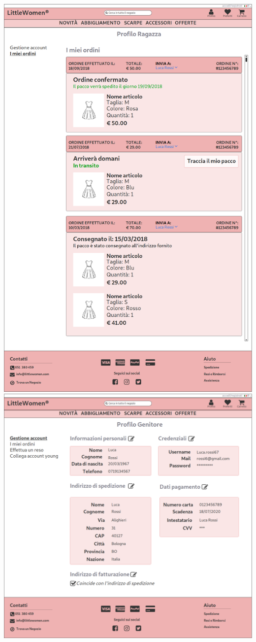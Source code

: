 \documentclass[12pt,a4paper]{report}
\begin{document}
\includegraphics[width=\textwidth]{"Project Management Sources/Wireframe/WireFrame Screenshot/Desktop/14 - Profilo Young Ordini"}
\includegraphics[width=\textwidth]{"Project Management Sources/Wireframe/WireFrame Screenshot/Desktop/15 - Profilo Genitore"}
\end{document}
